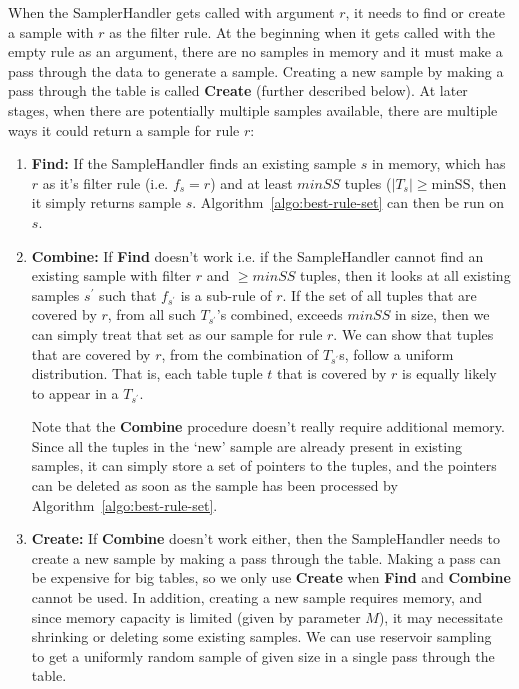 When the SamplerHandler gets called with argument $r$, it needs to find or create a sample with $r$ as the filter rule. At the beginning when it gets called with the empty rule as an argument, there are no samples in memory and it must make a pass through the data to generate a sample. Creating a new sample by making a pass through the table is called \textbf{Create} (further described below). At later stages, when there are potentially multiple samples available, there are multiple ways it could return a sample for rule $r$:
\begin{enumerate}
\item \textbf{Find:} If the SampleHandler finds an existing sample $s$ in memory, which has $r$ as it's filter rule (i.e. $f_s = r$) and at least $minSS$ tuples ($|T_s| \geq \text{minSS}$, then it simply returns sample $s$. Algorithm~\ref{algo:best-rule-set} can then be run on $s$. 

\item \textbf{Combine:} If \textbf{Find} doesn't work i.e. if the SampleHandler cannot find an existing sample with filter $r$ and $\geq minSS$ tuples, then it looks at all existing samples $s^{\prime}$ such that $f_{s^{\prime}}$ is a sub-rule of $r$. If the set of all tuples that are covered by $r$, from all such $T_{s^{\prime}}$'s combined, exceeds $minSS$ in size, then we can simply treat that set as our sample for rule $r$.
We can show that tuples that are covered by $r$, from the combination of $T_{s^{\prime}}$s, follow a uniform distribution. That is, each table tuple $t$ that is covered by $r$ is equally likely to appear in a $T_{s^{\prime}}$. 

Note that the \textbf{Combine} procedure doesn't really require additional memory. Since all the tuples in the `new' sample are already present in existing samples, it can simply store a set of pointers to the tuples, and the pointers can be deleted as soon as the sample has been processed by Algorithm~\ref{algo:best-rule-set}. 

\item \textbf{Create:} If \textbf{Combine} doesn't work either, then the SampleHandler needs to create a new sample by making a pass through the table. Making a pass can be expensive for big tables, so we only use \textbf{Create} when \textbf{Find} and \textbf{Combine} cannot be used. In addition, creating a new sample requires memory, and since memory capacity is limited (given by parameter $M$), it may necessitate shrinking or deleting some existing samples. 
We can use reservoir sampling~\cite{maibdr1983,Vitter:1985:RSR:3147.3165} to get a uniformly random sample of given size in a single pass through the table. 


\end{enumerate}
